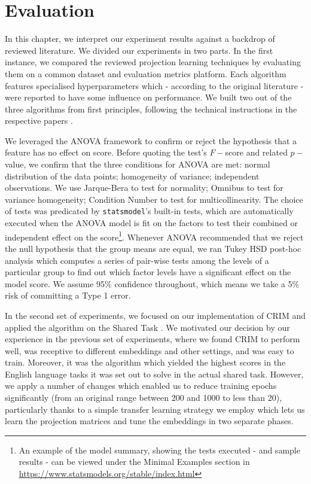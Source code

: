 \chapter{Evaluation}
In this chapter, we interpret our experiment results against a backdrop of reviewed literature.  We divided our experiments in two parts.  In the first instance, we compared the reviewed projection learning techniques by evaluating them on a common dataset and evaluation metrics platform.  Each algorithm features specialised hyperparameters which - according to the original literature - were reported to have some influence on performance.  We built two out of the three algorithms from first principles, following the technical instructions in the respective papers \citep{ustalov2017negative, bernier2018crim}.  

We leveraged the \ac{ANOVA} framework to confirm or reject the hypothesis that a feature has no effect on score.  Before quoting the test's $F-$score and related $p-$value, we confirm that the three conditions for \ac{ANOVA} are met: normal distribution of the data points; homogeneity of variance; independent observations.  We use Jarque-Bera to test for normality; Omnibus to test for variance homogeneity; Condition Number to test for multicollinearity.  The choice of tests was predicated by \texttt{statsmodel}'s built-in tests, which are automatically executed when the ANOVA model is fit on the factors to test their combined or independent effect on the score\footnote{An example of the model summary, showing the tests executed - and sample results - can be viewed under the Minimal Examples section in \url{https://www.statsmodels.org/stable/index.html}}.
Whenever \ac{ANOVA} recommended that we reject the null hypothesis that the group means are equal, we ran Tukey \ac{HSD} post-hoc analysis which computes a series of pair-wise tests among the levels of a particular group to find out which factor levels have a significant effect on the model score.  We assume 95\% confidence throughout, which means we take a 5\% risk of committing a Type 1 error.

In the second set of experiments, we focused on our implementation of CRIM \citep{bernier2018crim} and applied the algorithm on the Shared Task \citep{camacho2018semeval}.  We motivated our decision by our experience in the previous set of experiments, where we found CRIM to perform well, was receptive to different embeddings and other settings, and was easy to train.  Moreover, it was the algorithm which yielded the highest scores in the English language tasks it was set out to solve in the actual shared task.  However, we apply a number of changes which enabled us to reduce training epochs significantly (from an original range between 200 and 1000 to less than 20), particularly thanks to a simple transfer learning strategy we employ which lets us learn the projection matrices and tune the embeddings in two separate phases.

